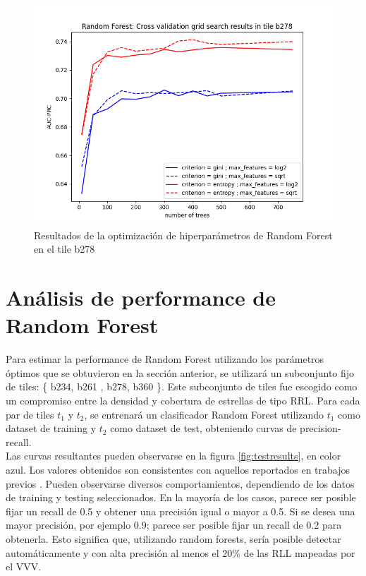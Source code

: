 \begin{figure}[h!]
\begin{center}
  \includegraphics[width=.6\textwidth]{Kap2/Figure_1.png}
  \end{center}
  \caption{Resultados de la optimización de hiperparámetros de Random Forest en el tile b278}
  \label{fig:optimisationrf}
\end{figure}

\section{ Análisis de performance de Random Forest }

Para estimar la performance de Random Forest utilizando los parámetros óptimos que se obtuvieron en la sección anterior, se utilizará un subconjunto fijo de tiles: \{ b234, b261 , b278, b360 \}. Este subconjunto de tiles fue escogido como un compromiso entre la densidad y cobertura de estrellas de tipo RRL\cite{jbc}. Para cada par de tiles $t_1$ y $t_2$, se entrenará un clasificador Random Forest utilizando $t_1$ como dataset de training y $t_2$ como dataset de test, obteniendo curvas de precision-recall. \\

Las curvas resultantes pueden observarse en la figura \ref{fig:testresults}, en color azul. Los valores obtenidos son consistentes con aquellos reportados en trabajos previos \cite{jbc}. Pueden observarse diversos comportamientos, dependiendo de los datos de training y testing seleccionados. En la mayoría de los casos, parece ser posible fijar un recall de 0.5 y obtener una precisión igual o mayor a 0.5. Si se desea una mayor precisión, por ejemplo 0.9; parece ser posible fijar un recall de 0.2 para obtenerla. Esto significa que, utilizando random forests, sería posible detectar automáticamente y con alta precisión al menos el 20\% de las RLL mapeadas por el VVV.




